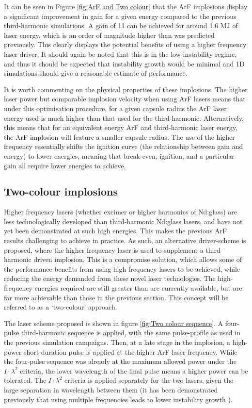 It can be seen in Figure \ref{fig:ArF and Two colour} that the ArF implosions display a significant improvement in gain for a given energy compared to the previous third-harmonic simulations. A gain of 11 can be achieved for around 1.6 MJ of laser energy, which is an order of magnitude higher than was predicted previously. This clearly displays the potential benefits of using a higher frequency laser driver. It should again be noted that this is in the low-instability regime, and thus it should be expected that instability growth would be minimal and 1D simulations should give a reasonable estimate of performance.

It is worth commenting on the physical properties of these implosions. The higher laser power but comparable implosion velocity when using ArF lasers means that under this optimisation procedure, for a given capsule radius the ArF laser energy used is much higher than that used for the third-harmonic. Alternatively, this means that for an equivalent energy ArF and third-harmonic laser energy, the ArF implosion will feature a smaller capsule radius. The use of the higher frequency essentially shifts the ignition curve (the relationship between gain and energy) to lower energies, meaning that break-even, ignition, and a particular gain all require lower energies to achieve.

\subsection{Two-colour implosions}

Higher frequency lasers (whether excimer or higher harmonics of Nd:glass) are less technologically developed than third-harmonic Nd:glass lasers, and have not yet been demonstrated at such high energies. This makes the previous ArF results challenging to achieve in practice. As such, an alternative driver-scheme is proposed, where the higher frequency laser is used to supplement a third-harmonic driven implosion. This is a compromise solution, which allows some of the performance benefits from using high frequency lasers to be achieved, while reducing the energy demanded from these novel laser technologies. The high-frequency energies required are still greater than are currently available, but are far more achievable than those in the previous section. This concept will be referred to as a `two-colour' approach.

The laser scheme proposed is shown in figure \ref{fig:Two colour sequence}. A four-pulse third-harmonic sequence is applied, with the same pulse-profile as used in the previous simulation campaigns. Then, at a late stage in the implosion, a high-power short-duration pulse is applied at the higher ArF laser-frequency. While the four-pulse sequence was already at the maximum allowed power under the $I \cdot \lambda^2$ criteria, the lower wavelength of the final pulse means a higher power can be tolerated. The $I \cdot \lambda^2$ criteria is applied separately for the two lasers, given the large separation in wavelength between them (it has been demonstrated previously that using multiple frequencies leads to lower instability growth \cite{Follett2018}).

